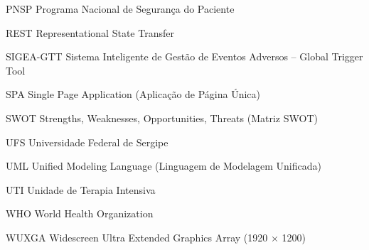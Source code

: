 \begin{siglas}
  \item[PNSP]{Programa Nacional de Segurança do Paciente}
  \item[REST]{Representational State Transfer}
  \item[SIGEA-GTT]{Sistema Inteligente de Gestão de Eventos Adversos – Global Trigger Tool}
  \item[SPA]{Single Page Application (Aplicação de Página Única)}
  \item[SWOT]{Strengths, Weaknesses, Opportunities, Threats (Matriz SWOT)}
  \item[UFS]{Universidade Federal de Sergipe}
  \item[UML]{Unified Modeling Language (Linguagem de Modelagem Unificada)}
  \item[UTI]{Unidade de Terapia Intensiva}
  \item[WHO]{World Health Organization}
  \item[WUXGA]{Widescreen Ultra Extended Graphics Array (1920 × 1200)}
\end{siglas}